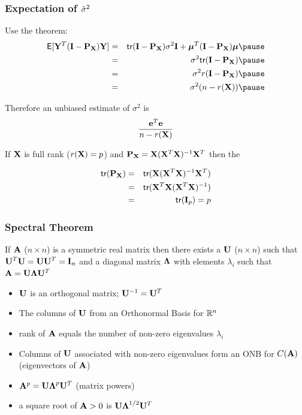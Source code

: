 \documentclass[handout]{beamer}
\begin{document}
\begin{frame}
  \frametitle{Expectation of ${\hat{\sigma}}^2$}

Use the theorem: \pause
\begin{eqnarray*}
\E[\Y^T (\I - \P_\X) \Y] & = &\tr (\I - \P_\X) \sigma^2 \I +
\mub^T(\I - \P_\X) \mub  \pause \\
 & = &  \sigma^2 \tr (\I - \P_\X) \pause \\
 & = & \sigma^2 r(\I - \P_\X) \pause\\
& = & \sigma^2 (n - r(\X)) \pause
\end{eqnarray*}


Therefore an unbiased estimate of $\sigma^2$ is $$\frac{\mathbf{e}^T\mathbf{e}}{n - r(\mathbf{X})}$$
\pause

If $\mathbf{X}$ is full rank ($r(\mathbf{X}) = p$) and $\mathbf{P}_{\mathbf{X}} = \mathbf{X}(\mathbf{X}^T\mathbf{X})^{-1} \mathbf{X}^T$ then the

\begin{eqnarray*}
\textsf{tr}(\mathbf{P}_{\mathbf{X}}) & = & \textsf{tr}( \mathbf{X}(\mathbf{X}^T\mathbf{X})^{-1} \mathbf{X}^T) \\
&  = &  \textsf{tr}(\mathbf{X}^T\mathbf{X}(\mathbf{X}^T\mathbf{X})^{-1}) \\
&  = & \textsf{tr}(\mathbf{I}_p) = p
\end{eqnarray*}


\end{frame}
\begin{frame}
  \frametitle{Spectral Theorem}
  \begin{theorem}
    If $\mathbf{A}$ ($n \times n$) is a symmetric real matrix  then there
    exists a  $\mathbf{U}$ ($n \times n$) such that $\mathbf{U}^T\mathbf{U} = \mathbf{U} \mathbf{U}^T = \mathbf{I}_n$
     and a diagonal matrix $\boldsymbol{\Lambda}$ with
    elements $\lambda_i$ such that $\mathbf{A} = \mathbf{U} \boldsymbol{\Lambda} \mathbf{U}^T$
  \end{theorem} \pause
  \begin{itemize}
  \item $\mathbf{U}$ is an orthogonal matrix; $\mathbf{U}^{-1} = \mathbf{U}^T$ \pause
  \item The columns of $\mathbf{U}$ from an Orthonormal Basis for $\mathbb{R}^n$ \pause
  \item rank of $\mathbf{A}$ equals the number of non-zero eigenvalues
    $\lambda_i$ \pause
  \item Columns of $\mathbf{U}$ associated with non-zero eigenvalues form an
    ONB for $C(\mathbf{A})$ (eigenvectors of $\mathbf{A}$) \pause
\item $\mathbf{A}^p = \mathbf{U} \boldsymbol{\Lambda}^p \mathbf{U}^T$ (matrix powers) \pause
\item a square root of $\mathbf{A} > 0$ is $\mathbf{U} \boldsymbol{\Lambda}^{1/2}\mathbf{U}^T$ \pause
  \end{itemize}
\end{frame}
\end{document}
